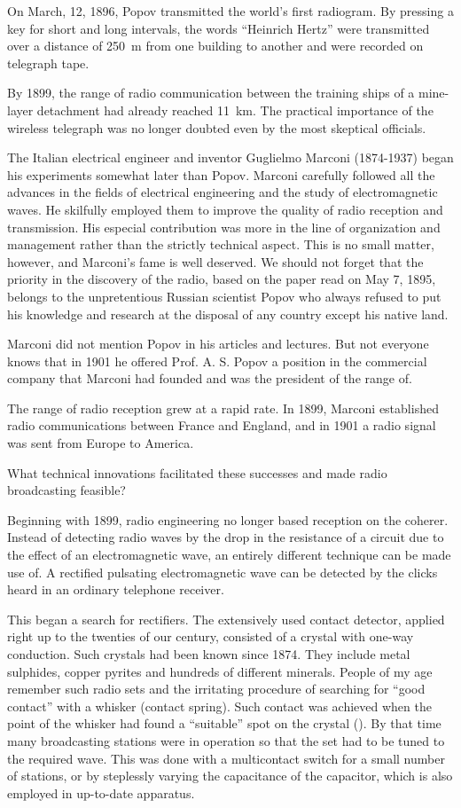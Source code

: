 On March, 12, 1896, Popov transmitted the world's first radiogram. By pressing a key for short and long intervals, the words ``Heinrich Hertz'' were transmitted over a distance of \SI{250}{\meter} from one building to another and were recorded on telegraph tape.

By 1899, the range of radio communication between the training ships of a mine-layer detachment had already reached \SI{11}{\kilo\meter}. The practical importance of the wireless telegraph was no longer doubted even by the most skeptical officials.

The Italian electrical engineer and inventor Guglielmo Marconi (1874-1937) began his experiments somewhat later than Popov. Marconi carefully followed all the advances in the fields of electrical engineering and the study of electromagnetic waves. He skilfully employed them to improve the quality of radio reception and transmission. His especial contribution was more in the line of organization and management rather than the strictly technical aspect. This is no small matter, however, and Marconi's fame is well deserved. We should not forget that the priority in the discovery of the radio, based on the paper read on May 7, 1895, belongs to the unpretentious Russian scientist Popov who always refused to put his knowledge and research at the disposal of any country except his native land.

Marconi did not mention Popov in his articles and lectures. But not everyone knows that in 1901 he offered Prof. A. S. Popov a position in the commercial company that Marconi had founded and was the president of the range of.

The range of radio reception grew at a rapid rate. In 1899, Marconi established radio communications between France and England, and in 1901 a radio signal was sent from Europe to America.

What technical innovations facilitated these successes and made radio broadcasting feasible?

Beginning with 1899, radio engineering no longer based reception on the coherer. Instead of detecting radio waves by the drop in the resistance of a circuit due to the effect of an electromagnetic wave, an entirely different technique can be made use of. A rectified pulsating electromagnetic wave can be detected by the clicks heard in an ordinary telephone receiver.

This began a search for rectifiers. The extensively used contact detector, applied right up to the twenties of our century, consisted of a crystal with one-way conduction. Such crystals had been known since 1874. They include metal sulphides, copper pyrites and hundreds of different minerals. People of my age remember such radio sets and the irritating procedure of searching for ``good contact'' with a whisker (contact spring). Such contact was achieved when the point of the whisker had found a ``suitable'' spot on the crystal (). By that time many broadcasting stations were in operation so that the set had to be tuned to the required wave. This was done with a multicontact switch for a small number of stations, or by steplessly varying the capacitance of the capacitor, which is also employed in up-to-date apparatus.

